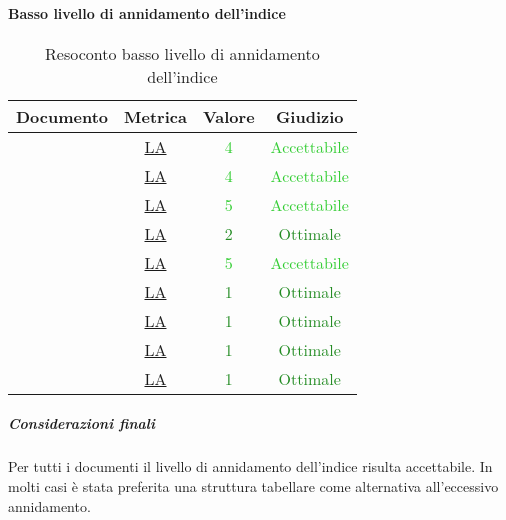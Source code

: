 \paragraph{Basso livello di annidamento dell'indice}
\begin{table}[H]
	\centering
	\small
	\begin{tabular}{c | c | c | c}
		\hline
		\textbf{Documento} & \textbf{Metrica} & \textbf{Valore} & \textbf{Giudizio} \\
		\hline
		\pdpvdue        & \hyperref[MLEC]{LA} & \textcolor{LimeGreen}{4} & \textcolor{LimeGreen}{Accettabile} \\
		\pdqvdue        & \hyperref[MLEC]{LA} & \textcolor{LimeGreen}{4} & \textcolor{LimeGreen}{Accettabile} \\
		\ndpvdue        & \hyperref[MLEC]{LA} & \textcolor{LimeGreen}{5} & \textcolor{LimeGreen}{Accettabile} \\
		\adrvdue        & \hyperref[MLEC]{LA}& \textcolor{ForestGreen}{2} & \textcolor{ForestGreen}{Ottimale} \\
		\stvuno		& \hyperref[MLEC]{LA} & \textcolor{LimeGreen}{5} & \textcolor{LimeGreen}{Accettabile} \\
		\glvdue        & \hyperref[MLEC]{LA} & \textcolor{ForestGreen}{1} & \textcolor{ForestGreen}{Ottimale} \\
		\vcinquei       &\hyperref[MLEC]{LA} & \textcolor{ForestGreen}{1} & \textcolor{ForestGreen}{Ottimale} \\
		\vseii       & \hyperref[MLEC]{LA} & \textcolor{ForestGreen}{1} & \textcolor{ForestGreen}{Ottimale} \\
		\vtree       & \hyperref[MLEC]{LA} & \textcolor{ForestGreen}{1} & \textcolor{ForestGreen}{Ottimale} \\
		\hline
	\end{tabular}
	\caption{Resoconto basso livello di annidamento dell'indice}
	\label{tab_resoconto_basso_livello_di_annidamento_indice}
\end{table}

\subparagraph{Considerazioni finali}
Per tutti i documenti il livello di annidamento dell'indice risulta accettabile. In molti casi è stata preferita una struttura tabellare come alternativa all'eccessivo annidamento.